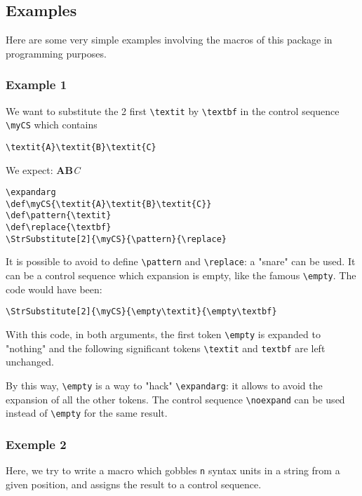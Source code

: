 \documentclass[english,a4paper,10pt]{article}
\newcommand\USs{syntax units\xspace}
\newcommand\styleexercice{\footnotesize}
\newcommand\verbinline{\lstinline[basicstyle=\normalsize\ttfamily]}
\begin{document}
\subsection{Examples}
\label{exemples}
Here are some very simple examples involving the macros of this package in programming purposes.

\subsubsection{Example 1}
We want to substitute the 2 first \verbinline|\textit| by \verbinline|\textbf| in the control sequence \verb|\myCS| which contains \par\smallskip
\hfill\verbinline|\textit{A}\textit{B}\textit{C}|\hfill{}
\medskip

We expect: \textbf{A}\textbf{B}\textit{C}\medskip

\begin{minipage}[c]{0.65\linewidth}
\begin{lstlisting}
\expandarg
\def\myCS{\textit{A}\textit{B}\textit{C}}
\def\pattern{\textit}
\def\replace{\textbf}
\StrSubstitute[2]{\myCS}{\pattern}{\replace}
\end{lstlisting}%
\end{minipage}\hfill
\begin{minipage}[c]{0.35\linewidth}
	\styleexercice
	\expandarg
	\def\myCS{\textit{A}\textit{B}\textit{C}}
	\def\pattern{\textit}
	\def\replace{\textbf}
	\StrSubstitute[2]{\myCS}{\pattern}{\replace}
\end{minipage}%
\medskip

It is possible to avoid to define \verb|\pattern| and \verb|\replace|: a "snare" can be used. It can be a control sequence which expansion is empty, like the famous \verbinline|\empty|. The code would have been:\par\nobreak\smallskip
\hfil\verbinline|\StrSubstitute[2]{\myCS}{\empty\textit}{\empty\textbf}|\hfil{}\medskip

With this code, in both arguments, the first token \verbinline|\empty| is expanded to "nothing" and the following significant tokens \verbinline|\textit| and \verbinline|textbf| are left unchanged.\smallskip

By this way, \verbinline|\empty| is a way to "hack" \verbinline|\expandarg|: it allows to avoid the expansion of all the other tokens. The control sequence \verbinline|\noexpand| can be used instead of \verbinline|\empty| for the same result.

\subsubsection{Exemple 2}
Here, we try to write a macro which gobbles \verb|n| \USs in a string from a given position, and assigns the result to a control sequence.
\end{document}
